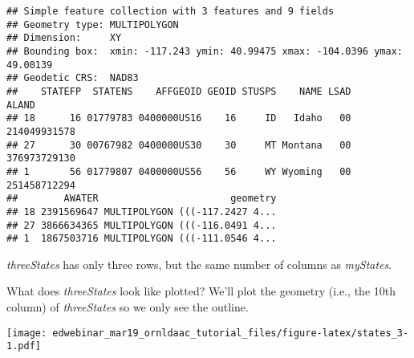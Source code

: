 \documentclass[
]{article}
\newenvironment{Shaded}{\begin{snugshade}}{\end{snugshade}}
\newcommand{\CommentTok}[1]{\textcolor[rgb]{0.56,0.35,0.01}{\textit{#1}}}
\newcommand{\FunctionTok}[1]{\textcolor[rgb]{0.13,0.29,0.53}{\textbf{#1}}}
\newcommand{\NormalTok}[1]{#1}
\newcommand{\OtherTok}[1]{\textcolor[rgb]{0.56,0.35,0.01}{#1}}
\newcommand{\SpecialCharTok}[1]{\textcolor[rgb]{0.81,0.36,0.00}{\textbf{#1}}}
\newcommand{\StringTok}[1]{\textcolor[rgb]{0.31,0.60,0.02}{#1}}
\begin{document}
\begin{Shaded}
\end{Shaded}

\begin{verbatim}
## Simple feature collection with 3 features and 9 fields
## Geometry type: MULTIPOLYGON
## Dimension:     XY
## Bounding box:  xmin: -117.243 ymin: 40.99475 xmax: -104.0396 ymax: 49.00139
## Geodetic CRS:  NAD83
##    STATEFP  STATENS    AFFGEOID GEOID STUSPS    NAME LSAD        ALAND
## 18      16 01779783 0400000US16    16     ID   Idaho   00 214049931578
## 27      30 00767982 0400000US30    30     MT Montana   00 376973729130
## 1       56 01779807 0400000US56    56     WY Wyoming   00 251458712294
##        AWATER                       geometry
## 18 2391569647 MULTIPOLYGON (((-117.2427 4...
## 27 3866634365 MULTIPOLYGON (((-116.0491 4...
## 1  1867503716 MULTIPOLYGON (((-111.0546 4...
\end{verbatim}

\emph{threeStates} has only three rows, but the same number of columns
as \emph{myStates}.

What does \emph{threeStates} look like plotted? We'll plot the geometry
(i.e., the 10th column) of \emph{threeStates} so we only see the
outline.

\begin{Shaded}
\end{Shaded}

\texttt{[image: edwebinar\_mar19\_ornldaac\_tutorial\_files/figure-latex/states\_3-1.pdf]}
\end{document}
